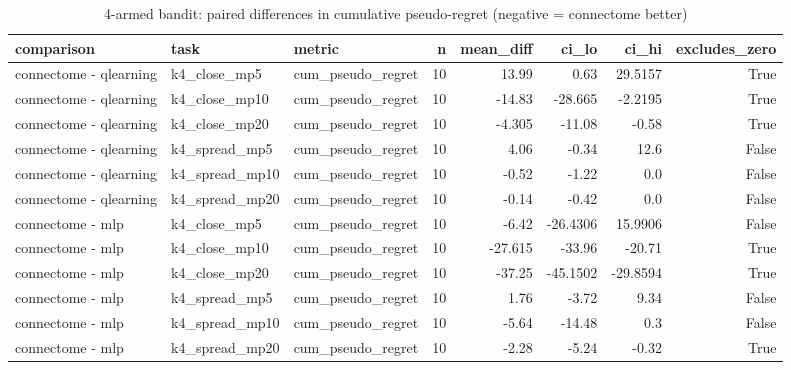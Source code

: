 \begin{table}[t]
\centering
\small
\begin{tabular}{lllrrrrr}
\toprule
comparison & task & metric & n & mean\_diff & ci\_lo & ci\_hi & excludes\_zero \\
\midrule
connectome - qlearning & k4\_close\_mp5 & cum\_pseudo\_regret & 10 & 13.99 & 0.63 & 29.5157 & True \\
connectome - qlearning & k4\_close\_mp10 & cum\_pseudo\_regret & 10 & -14.83 & -28.665 & -2.2195 & True \\
connectome - qlearning & k4\_close\_mp20 & cum\_pseudo\_regret & 10 & -4.305 & -11.08 & -0.58 & True \\
connectome - qlearning & k4\_spread\_mp5 & cum\_pseudo\_regret & 10 & 4.06 & -0.34 & 12.6 & False \\
connectome - qlearning & k4\_spread\_mp10 & cum\_pseudo\_regret & 10 & -0.52 & -1.22 & 0.0 & False \\
connectome - qlearning & k4\_spread\_mp20 & cum\_pseudo\_regret & 10 & -0.14 & -0.42 & 0.0 & False \\
connectome - mlp & k4\_close\_mp5 & cum\_pseudo\_regret & 10 & -6.42 & -26.4306 & 15.9906 & False \\
connectome - mlp & k4\_close\_mp10 & cum\_pseudo\_regret & 10 & -27.615 & -33.96 & -20.71 & True \\
connectome - mlp & k4\_close\_mp20 & cum\_pseudo\_regret & 10 & -37.25 & -45.1502 & -29.8594 & True \\
connectome - mlp & k4\_spread\_mp5 & cum\_pseudo\_regret & 10 & 1.76 & -3.72 & 9.34 & False \\
connectome - mlp & k4\_spread\_mp10 & cum\_pseudo\_regret & 10 & -5.64 & -14.48 & 0.3 & False \\
connectome - mlp & k4\_spread\_mp20 & cum\_pseudo\_regret & 10 & -2.28 & -5.24 & -0.32 & True \\
\bottomrule
\end{tabular}
\caption{4-armed bandit: paired differences in cumulative pseudo-regret (negative = connectome better)}
\label{tab:bandit_multi_paired}
\end{table}